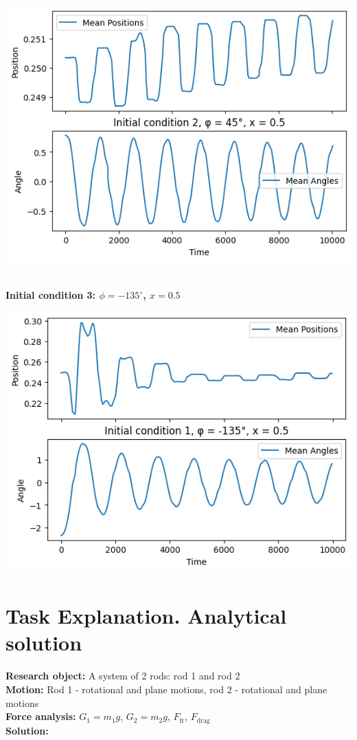 \documentclass{article}
\begin{document}
\includegraphics*[scale=0.5]{graphics/init_2.png}\\\\

\newpage 

\textbf{Initial condition 3: $\phi = -135^\circ$, $x = 0.5$}

\includegraphics*[scale=0.5]{graphics/init_3.png}

\section{Task Explanation. Analytical solution}

\textbf{Research object:} A system of 2 rods: rod 1 and rod 2\\
\textbf{Motion:} Rod 1 - rotational and plane motions, rod 2 - rotational and plane motions\\
\textbf{Force analysis:} $G_1 = m_1 g$, $G_2 = m_2 g$, $F_\text{fr}$, $F_\text{drag}$\\
\textbf{Solution:}
\end{document}
